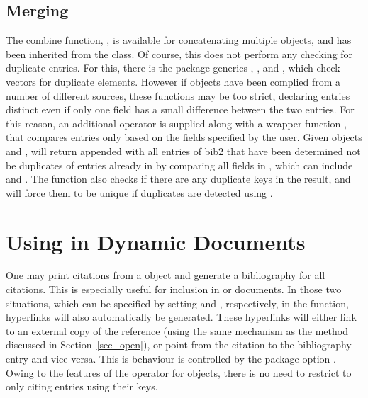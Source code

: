 \documentclass[article]{jss}\usepackage[]{graphicx}\usepackage[]{color}
\newcommand{\ourpkg}{\pkg{RefManageR}}
\newcommand{\bt}{\`{}}
\begin{document}
\subsection{Merging}
The combine function, , is available for concatenating multiple  objects, and has been inherited from the  class.  Of course, this does not perform any checking for duplicate entries.  For this, there is the  package generics , , and , which check vectors for duplicate elements.  However if  objects have been complied from a number of different sources, these functions may be too strict, declaring entries distinct even if only one field has a small difference between the two entries.  For this reason, an additional operator  is supplied along with a wrapper function , that compares entries only based on the fields specified by the user.  Given  objects  and ,  will return  appended with all entries of bib2 that have been determined not be duplicates of entries already in  by comparing all fields in , which can include  and .  The function also checks if there are any duplicate keys in the result, and will force them to be unique if duplicates are detected using . 

\section[Using RefManageR in Dynamic Documents]{Using \ourpkg{} in Dynamic Documents}\label{sec_cite}
One may print citations from a  object and generate a bibliography for all citations.  This is especially useful for inclusion in  or  documents.  In those two situations, which can be specified by setting  and , respectively, in the  function, hyperlinks will also automatically be generated.  These hyperlinks will either link to an external copy of the reference (using the same mechanism as the  method discussed in Section~\ref{sec_open}), or point from the citation to the bibliography entry and vice versa.  This is behaviour is controlled by the package option .  Owing to the features of the \code{\bt[\bt} operator for  objects, there is no need to restrict to only citing entries using their keys.
\end{document}

